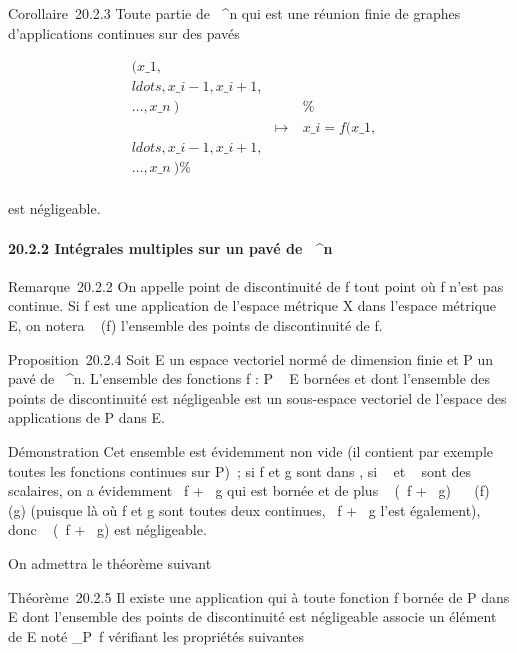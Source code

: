 \documentclass[]{article}
\begin{document}
Corollaire~20.2.3 Toute partie de ~^n qui est une réunion
finie de graphes d'applications continues sur des pavés

\begin{align*}
(x\_1,\\ldots,x\_i-1,x\_i+1,\\\ldots,x\_n~)&&
\%& \\ & \mapsto~&
x\_i =
f(x\_1,\\ldots,x\_i-1,x\_i+1,\\\ldots,x\_n~)\%&
\\ \end{align*}

est négligeable.

\paragraph{20.2.2 Intégrales multiples sur un pavé de ~^n}

Remarque~20.2.2 On appelle point de discontinuité de f tout point où f
n'est pas continue. Si f est une application de l'espace métrique X dans
l'espace métrique E, on notera
\mathrmDisc~ (f) l'ensemble
des points de discontinuité de f.

Proposition~20.2.4 Soit E un espace vectoriel normé de dimension finie
et P un pavé de ~^n. L'ensemble  des fonctions f : P \rightarrow~ E
bornées et dont l'ensemble des points de discontinuité est négligeable
est un sous-espace vectoriel de l'espace des applications de P dans E.

Démonstration Cet ensemble est évidemment non vide (il contient par
exemple toutes les fonctions continues sur P)~; si f et g sont dans ,
si \alpha~ et \beta~ sont des scalaires, on a évidemment \alpha~f + \beta~g qui est bornée et
de plus \mathrmDisc~ (\alpha~f +
\beta~g) \subset~\mathrmDisc~ (f)
\cup\mathrmDisc~ (g) (puisque
là où f et g sont toutes deux continues, \alpha~f + \beta~g l'est également), donc
\mathrmDisc~ (\alpha~f + \beta~g) est
négligeable.

On admettra le théorème suivant

Théorème~20.2.5 Il existe une application qui à toute fonction f bornée
de P dans E dont l'ensemble des points de discontinuité est négligeable
associe un élément de E noté \int  \_P~f
vérifiant les propriétés suivantes
\end{document}
